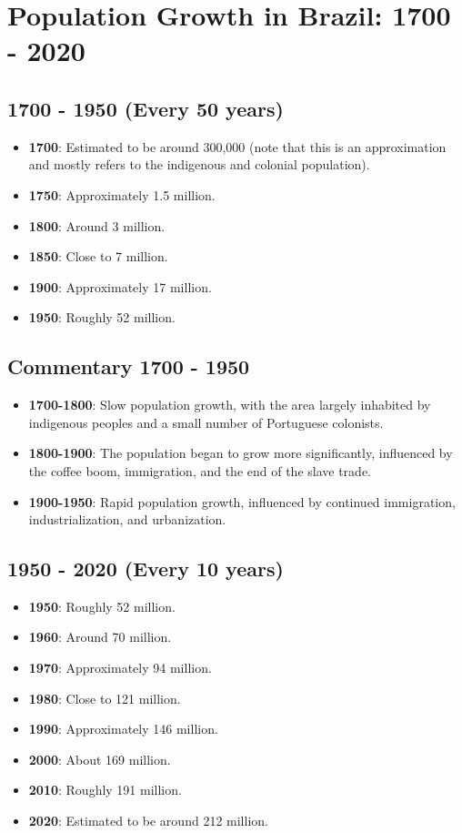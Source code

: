 \section*{Population Growth in Brazil: 1700 - 2020}

\subsection*{1700 - 1950 (Every 50 years)}
\begin{itemize}
    \item \textbf{1700}: Estimated to be around 300,000 (note that this is an approximation and mostly refers to the indigenous and colonial population).
    \item \textbf{1750}: Approximately 1.5 million.
    \item \textbf{1800}: Around 3 million.
    \item \textbf{1850}: Close to 7 million.
    \item \textbf{1900}: Approximately 17 million.
    \item \textbf{1950}: Roughly 52 million.
\end{itemize}

\subsection*{Commentary 1700 - 1950}
\begin{itemize}
    \item \textbf{1700-1800}: Slow population growth, with the area largely inhabited by indigenous peoples and a small number of Portuguese colonists.
    \item \textbf{1800-1900}: The population began to grow more significantly, influenced by the coffee boom, immigration, and the end of the slave trade.
    \item \textbf{1900-1950}: Rapid population growth, influenced by continued immigration, industrialization, and urbanization.
\end{itemize}

\subsection*{1950 - 2020 (Every 10 years)}
\begin{itemize}
    \item \textbf{1950}: Roughly 52 million.
    \item \textbf{1960}: Around 70 million.
    \item \textbf{1970}: Approximately 94 million.
    \item \textbf{1980}: Close to 121 million.
    \item \textbf{1990}: Approximately 146 million.
    \item \textbf{2000}: About 169 million.
    \item \textbf{2010}: Roughly 191 million.
    \item \textbf{2020}: Estimated to be around 212 million.
\end{itemize}

